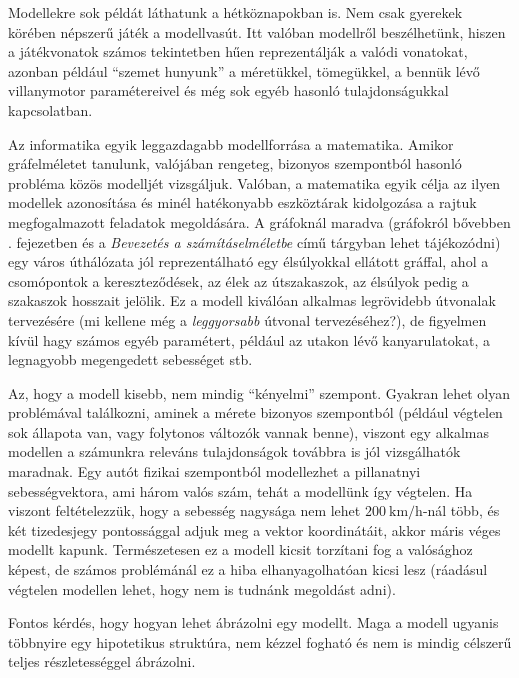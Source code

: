 \begin{pelda}
	Modellekre sok példát láthatunk a hétköznapokban is. Nem csak gyerekek körében népszerű játék a modellvasút. Itt valóban modellről beszélhetünk, hiszen a játékvonatok számos tekintetben hűen reprezentálják a valódi vonatokat, azonban például ``szemet hunyunk'' a méretükkel, tömegükkel, a bennük lévő villanymotor paramétereivel és még sok egyéb hasonló tulajdonságukkal kapcsolatban.
	
	Az informatika egyik leggazdagabb modellforrása a matematika. Amikor gráfelméletet tanulunk, valójában rengeteg, bizonyos szempontból hasonló probléma közös modelljét vizsgáljuk. Valóban, a matematika egyik célja az ilyen modellek azonosítása és minél hatékonyabb eszköztárak kidolgozása a rajtuk megfogalmazott feladatok megoldására. A gráfoknál maradva (gráfokról bővebben . fejezetben és a \emph{Bevezetés a számításelméletbe} című tárgyban lehet tájékozódni) egy város úthálózata jól reprezentálható egy élsúlyokkal ellátott gráffal, ahol a csomópontok a kereszteződések, az élek az útszakaszok, az élsúlyok pedig a szakaszok hosszait jelölik. Ez a modell kiválóan alkalmas legrövidebb útvonalak tervezésére (mi kellene még a \emph{leggyorsabb} útvonal tervezéséhez?), de figyelmen kívül hagy számos egyéb paramétert, például az utakon lévő kanyarulatokat, a legnagyobb megengedett sebességet stb.
\end{pelda}

\begin{megjegyzes}
	Az, hogy a modell kisebb, nem mindig ``kényelmi'' szempont. Gyakran lehet olyan problémával találkozni, aminek a mérete bizonyos szempontból  (például végtelen sok állapota van, vagy folytonos változók vannak benne), viszont egy alkalmas  modellen a számunkra releváns tulajdonságok továbbra is jól vizsgálhatók maradnak. Egy autót fizikai szempontból modellezhet a pillanatnyi sebességvektora, ami három valós szám, tehát a modellünk így végtelen. Ha viszont feltételezzük, hogy a sebesség nagysága nem lehet $200~\textrm{km/h}$-nál több, és két tizedesjegy pontossággal adjuk meg a vektor koordinátáit, akkor máris véges modellt kapunk. Természetesen ez a modell kicsit torzítani fog a valósághoz képest, de számos problémánál ez a hiba elhanyagolhatóan kicsi lesz (ráadásul végtelen modellen lehet, hogy nem is tudnánk megoldást adni).
\end{megjegyzes}

Fontos kérdés, hogy hogyan lehet ábrázolni egy modellt. Maga a modell ugyanis többnyire egy hipotetikus struktúra, nem kézzel fogható és nem is mindig célszerű teljes részletességgel ábrázolni.

